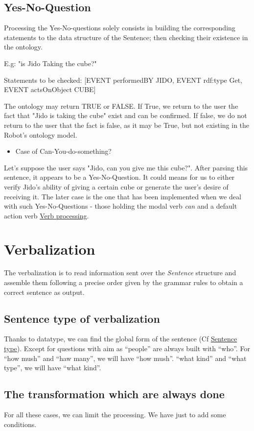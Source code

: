 \documentclass[twoside,a4paper,10pt]{report}
\newcommand{\dokutitleleveltwo}[1]{\chapter{#1}}
\newcommand{\dokutitleleveltree}[1]{\section{#1}}
\newcommand{\dokuitalic}[1]{\textsl{#1}}
\newcommand{\dokuitem}{\item}
\begin{document}
\dokutitleleveltree{Yes-No-Question}
\label{e6969eb2ee1774772084bddc0430fbd3}%
Processing the Yes-No-questions solely consists in building the corresponding statements to the data structure of the Sentence;
then checking their existence in the ontology. 

E.g: "is Jido Taking the cube?"


\small
\begin{verbatimtab}
  Statements to be checked:
      [EVENT performedBY JIDO,
       EVENT rdf:type Get,
       EVENT actsOnObject CUBE]
\end{verbatimtab}
\normalsize
The ontology may return TRUE or FALSE. If True, we return to the user the fact that "Jido is taking the cube" exist and can be confirmed. If false, we do not return to the user that
the fact is false, as it may be True, but not existing in the Robot's ontology model.



\begin{itemize}
\dokuitem  Case of Can-You-do-something?
\end{itemize}
Let's suppose the user says "Jido, can you give me this cube?". 
After parsing this sentence, it appears to be a Yes-No-Question. It could means for us to either verify Jido's ability of giving a certain cube or generate the user's desire of receiving it.
The later case is the one that has been implemented when we deal with such Yes-No-Questions - those holding the modal verb \dokuitalic{can} and a default action verb \hyperref[d579d8cc3406c0556913bbaac7ee85e6]{Verb processing}.


\dokutitleleveltwo{Verbalization}
\label{8f5fecd7d65dd4b39822e786e6aa17f8}%
The verbalization is to read information sent over the \dokuitalic{Sentence} structure and assemble them following a precise order given by the grammar rules to obtain a correct sentence as output.


\dokutitleleveltree{Sentence type of verbalization}
\label{3932b1b4e5441078c313fdb09ac327bd}%
Thanks to data{\textunderscore}type, we can find the global form of the sentence (Cf \hyperref[1cae782fdfad8b38f1b3641092175803]{Sentence type}). Except for questions with aim as “people” are always built with “who”. For “how mush” and “haw many”, we will have “how mush”. “what kind” and “what type”, we will have “what kind”.


\dokutitleleveltree{The transformation which are always done}
\label{bb9df422d8d164804928d2b3ad4898ec}%
For all these cases, we can limit the processing. We have just to add some conditions.
\end{document}
